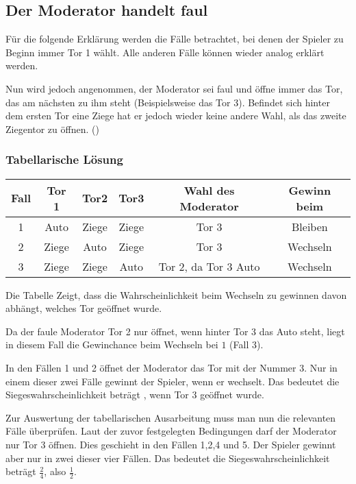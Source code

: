 
\subsection{Der Moderator handelt faul}

Für die folgende Erklärung werden die Fälle betrachtet, bei denen der Spieler zu Beginn immer Tor 1 wählt. Alle anderen Fälle können wieder analog erklärt werden.

Nun wird jedoch angenommen, der Moderator sei faul und öffne immer das Tor, das am nächsten zu ihm steht (Beispielsweise das Tor 3). Befindet sich hinter dem ersten Tor eine Ziege hat er jedoch wieder keine andere Wahl, als das zweite Ziegentor zu öffnen. (\cite{Rosenthal:2008})

\subsubsection{Tabellarische Lösung}

\begin{tabular}[h]{|c|c|c|c|c|c|}
    \hline
    \textbf{Fall} & \textbf{Tor 1} & \textbf{Tor2} & \textbf{Tor3} & \textbf{Wahl des Moderator} & \textbf{Gewinn beim} \\
    \hline
    1             & Auto           & Ziege         & Ziege         & Tor 3                       & Bleiben              \\
    2             & Ziege          & Auto          & Ziege         & Tor 3                       & Wechseln             \\
    3             & Ziege          & Ziege         & Auto          & Tor 2, da Tor 3 Auto        & Wechseln             \\
    \hline
\end{tabular}

Die Tabelle Zeigt, dass die Wahrscheinlichkeit beim Wechseln zu gewinnen davon abhängt, welches Tor geöffnet wurde.

Da der faule Moderator Tor 2 nur öffnet, wenn hinter Tor 3 das Auto steht, liegt in diesem Fall die Gewinchance beim Wechseln bei $1$ (Fall 3).

In den Fällen 1 und 2 öffnet der Moderator das Tor mit der Nummer 3. Nur in einem dieser zwei Fälle gewinnt der Spieler, wenn er wechselt. Das bedeutet die Siegeswahrscheinlichkeit beträgt , wenn Tor 3 geöffnet wurde.

Zur Auswertung der tabellarischen Ausarbeitung muss man nun die relevanten Fälle überprüfen. Laut der zuvor festgelegten Bedingungen darf der Moderator nur Tor 3 öffnen.
Dies geschieht in den Fällen 1,2,4 und 5. Der Spieler gewinnt aber nur in zwei dieser vier Fällen. Das bedeutet die Siegeswahrscheinlichkeit beträgt $\frac{2}{4}$,
also $\frac{1}{2}$.

